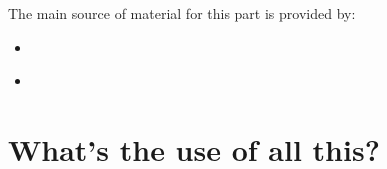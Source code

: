 

\label{chap:panorama}
\begin{refsection}

   

   The main source of material for this part is provided by:
   \begin{itemize}
      \item \textcite{Hastie.Tibshirani.ea:2009}
      \item \textcite{Bishop:2006}
   \end{itemize}

   \section{What's the use of all this?}
   


\printbibliography[heading=subbibliography]
\end{refsection}
